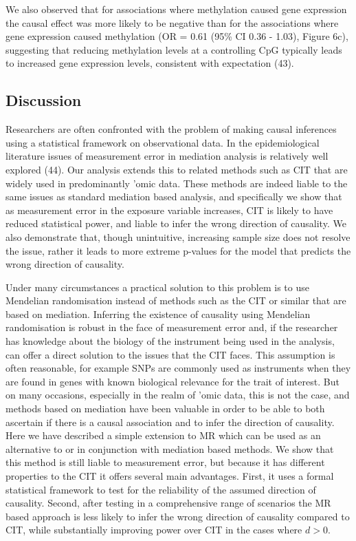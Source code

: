 \documentclass[]{article}
\begin{document}
We also observed that for associations where methylation caused gene
expression the causal effect was more likely to be negative than for the
associations where gene expression caused methylation (OR = 0.61 (95\%
CI 0.36 - 1.03), Figure 6c), suggesting that reducing methylation levels
at a controlling CpG typically leads to increased gene expression
levels, consistent with expectation (43).

\subsection{Discussion}\label{discussion}

Researchers are often confronted with the problem of making causal
inferences using a statistical framework on observational data. In the
epidemiological literature issues of measurement error in mediation
analysis is relatively well explored (44). Our analysis extends this to
related methods such as CIT that are widely used in predominantly 'omic
data. These methods are indeed liable to the same issues as standard
mediation based analysis, and specifically we show that as measurement
error in the exposure variable increases, CIT is likely to have reduced
statistical power, and liable to infer the wrong direction of causality.
We also demonstrate that, though unintuitive, increasing sample size
does not resolve the issue, rather it leads to more extreme p-values for
the model that predicts the wrong direction of causality.

Under many circumstances a practical solution to this problem is to use
Mendelian randomisation instead of methods such as the CIT or similar
that are based on mediation. Inferring the existence of causality using
Mendelian randomisation is robust in the face of measurement error and,
if the researcher has knowledge about the biology of the instrument
being used in the analysis, can offer a direct solution to the issues
that the CIT faces. This assumption is often reasonable, for example
SNPs are commonly used as instruments when they are found in genes with
known biological relevance for the trait of interest. But on many
occasions, especially in the realm of 'omic data, this is not the case,
and methods based on mediation have been valuable in order to be able to
both ascertain if there is a causal association and to infer the
direction of causality. Here we have described a simple extension to MR
which can be used as an alternative to or in conjunction with mediation
based methods. We show that this method is still liable to measurement
error, but because it has different properties to the CIT it offers
several main advantages. First, it uses a formal statistical framework
to test for the reliability of the assumed direction of causality.
Second, after testing in a comprehensive range of scenarios the MR based
approach is less likely to infer the wrong direction of causality
compared to CIT, while substantially improving power over CIT in the
cases where \(d > 0\).
\end{document}
